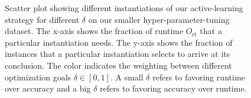 \documentclass[runningheads]{llncs}
\begin{document}

\begin{figure}[tb!]
  \centering
  \caption{
    Scatter plot showing different instantiations of our active-learning strategy for different $\delta$ on our smaller hyper-parameter-tuning dataset.
    The x-axis shows the fraction of runtime $O_{\operatorname{rt}}$ that a particular instantiation needs.
    The y-axis shows the fraction of instances that a particular instantiation selects to arrive at its conclusion.
    The color indicates the weighting between different optimization goals $\delta \in \left[0, 1\right]$.
    A small $\delta$ refers to favoring runtime over accuracy and a big $\delta$ refers to favoring accuracy over runtime.
  }
  \label{fig:annitrainoptgoal}
\end{figure}
\end{document}
